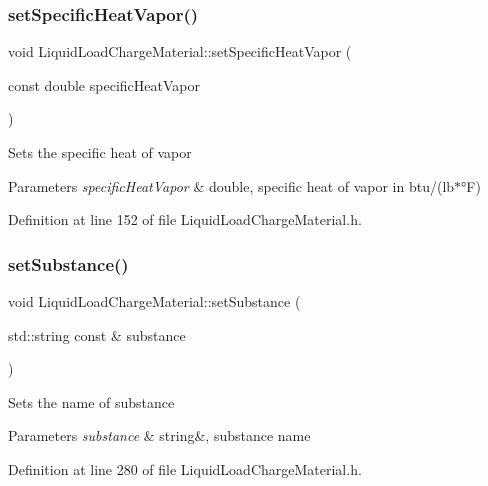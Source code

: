 \subsubsection{\texorpdfstring{set\+Specific\+Heat\+Vapor()}{setSpecificHeatVapor()}}
{\footnotesize\ttfamily void Liquid\+Load\+Charge\+Material\+::set\+Specific\+Heat\+Vapor (\begin{DoxyParamCaption}\item[{const double}]{specific\+Heat\+Vapor }\end{DoxyParamCaption})\hspace{0.3cm}{\ttfamily [inline]}}

Sets the specific heat of vapor 
\begin{DoxyParams}{Parameters}
{\em specific\+Heat\+Vapor} & double, specific heat of vapor in btu/(lb$\ast$°F) \\
\hline
\end{DoxyParams}


Definition at line 152 of file Liquid\+Load\+Charge\+Material.\+h.

\mbox{\label{class_liquid_load_charge_material_a85bb43270c6a11a1eaf51f00da16746a}} 
\subsubsection{\texorpdfstring{set\+Substance()}{setSubstance()}}
{\footnotesize\ttfamily void Liquid\+Load\+Charge\+Material\+::set\+Substance (\begin{DoxyParamCaption}\item[{std\+::string const \&}]{substance }\end{DoxyParamCaption})\hspace{0.3cm}{\ttfamily [inline]}}

Sets the name of substance 
\begin{DoxyParams}{Parameters}
{\em substance} & string\&, substance name \\
\hline
\end{DoxyParams}


Definition at line 280 of file Liquid\+Load\+Charge\+Material.\+h.

\mbox{\label{class_liquid_load_charge_material_a39c258d0bfdcfa352590d411a8c4e882}} 
